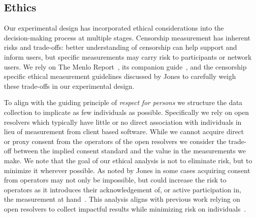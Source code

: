 \subsection{Ethics}\label{sec:methodology:ethics}
Our experimental design has incorporated ethical considerations into the
decision-making process at multiple stages.
Censorship measurement has inherent risks and trade-offs: better understanding
of censorship can help support and inform users, but specific measurements may
carry risk to participants or network users.
We rely on The Menlo Report~\cite{menlo}, its companion
guide~\cite{menlo-companion}, and the censorship specific ethical measurement
guidelines discussed by Jones \etal \cite{jones2015ethical} to
carefully weigh these trade-offs in our experimental design.

To align with the guiding principle of \textit{respect for persons} we
structure the data collection to implicate as few individuals as possible.
Specifically we rely on open resolvers which typically have little or no direct
association with individuals in lieu of measurement from client based
software. While we cannot acquire direct or proxy consent from the operators of
the open resolvers we consider the trade-off between the implied consent
standard and the value in the measurements we make. 
We note that the goal of our ethical analysis is not to eliminate risk, but to
minimize it wherever possible. As noted by Jones \etal in some cases acquiring
consent from operators may not only be impossible, but could increase the risk to
operators as it introduces their acknowledgement of, or active participation
in, the measurement at hand~\cite{jones2015ethical}. This analysis aligns with
previous work relying on open resolvers to collect impactful results while
minimizing risk on
individuals~\cite{pearce2017global,scott2016satellite,sundara2020censored}.

